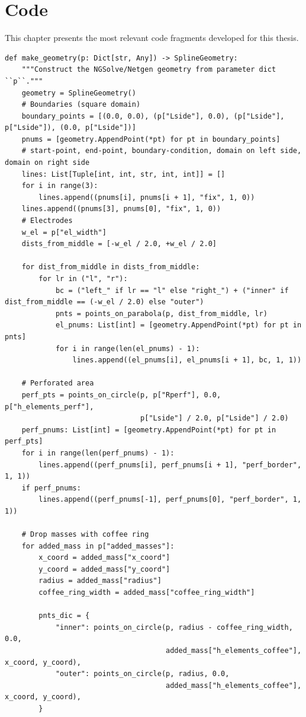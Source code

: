 \chapter{Code}
\label{sec:appendixB}

This chapter presents the most relevant code fragments developed for this thesis.

\begin{verbatim}
def make_geometry(p: Dict[str, Any]) -> SplineGeometry:
    """Construct the NGSolve/Netgen geometry from parameter dict ``p``."""
    geometry = SplineGeometry()
    # Boundaries (square domain)
    boundary_points = [(0.0, 0.0), (p["Lside"], 0.0), (p["Lside"], p["Lside"]), (0.0, p["Lside"])]
    pnums = [geometry.AppendPoint(*pt) for pt in boundary_points]
    # start-point, end-point, boundary-condition, domain on left side, domain on right side
    lines: List[Tuple[int, int, str, int, int]] = []
    for i in range(3):
        lines.append((pnums[i], pnums[i + 1], "fix", 1, 0))
    lines.append((pnums[3], pnums[0], "fix", 1, 0))
    # Electrodes
    w_el = p["el_width"]
    dists_from_middle = [-w_el / 2.0, +w_el / 2.0]

    for dist_from_middle in dists_from_middle:
        for lr in ("l", "r"):
            bc = ("left_" if lr == "l" else "right_") + ("inner" if dist_from_middle == (-w_el / 2.0) else "outer")
            pnts = points_on_parabola(p, dist_from_middle, lr)
            el_pnums: List[int] = [geometry.AppendPoint(*pt) for pt in pnts]
            for i in range(len(el_pnums) - 1):
                lines.append((el_pnums[i], el_pnums[i + 1], bc, 1, 1))

    # Perforated area
    perf_pts = points_on_circle(p, p["Rperf"], 0.0, p["h_elements_perf"],
                                p["Lside"] / 2.0, p["Lside"] / 2.0)
    perf_pnums: List[int] = [geometry.AppendPoint(*pt) for pt in perf_pts]
    for i in range(len(perf_pnums) - 1):
        lines.append((perf_pnums[i], perf_pnums[i + 1], "perf_border", 1, 1))
    if perf_pnums:
        lines.append((perf_pnums[-1], perf_pnums[0], "perf_border", 1, 1))

    # Drop masses with coffee ring
    for added_mass in p["added_masses"]:
        x_coord = added_mass["x_coord"]
        y_coord = added_mass["y_coord"]
        radius = added_mass["radius"]
        coffee_ring_width = added_mass["coffee_ring_width"]

        pnts_dic = {
            "inner": points_on_circle(p, radius - coffee_ring_width, 0.0,
                                      added_mass["h_elements_coffee"], x_coord, y_coord),
            "outer": points_on_circle(p, radius, 0.0,
                                      added_mass["h_elements_coffee"], x_coord, y_coord),
        }


\end{verbatim}

